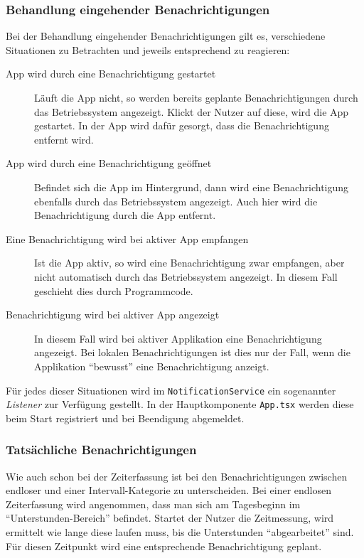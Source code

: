 \subsubsection{Behandlung eingehender Benachrichtigungen}
Bei der Behandlung eingehender Benachrichtigungen gilt es,
verschiedene Situationen zu Betrachten und jeweils entsprechend zu reagieren: \cite{Introduc87:online}
\begin{description}
    \item[App wird durch eine Benachrichtigung gestartet]
    Läuft die App nicht, so werden bereits geplante Benachrichtigungen durch das Betriebssystem angezeigt.
    Klickt der Nutzer auf diese, wird die App gestartet.
    In der App wird dafür gesorgt, dass die Benachrichtigung entfernt wird.

    \item[App wird durch eine Benachrichtigung geöffnet]
    Befindet sich die App im Hintergrund,
    dann wird eine Benachrichtigung ebenfalls durch das Betriebssystem angezeigt.
    Auch hier wird die Benachrichtigung durch die App entfernt.

    \item[Eine Benachrichtigung wird bei aktiver App empfangen]
    Ist die App aktiv, so wird eine Benachrichtigung zwar empfangen,
    aber nicht automatisch durch das Betriebssystem angezeigt.
    In diesem Fall geschieht dies durch Programmcode.

    \item[Benachrichtigung wird bei aktiver App angezeigt]
    In diesem Fall wird bei aktiver Applikation eine Benachrichtigung angezeigt.
    Bei lokalen Benachrichtigungen ist dies nur der Fall,
    wenn die Applikation \enquote{bewusst} eine Benachrichtigung anzeigt.
\end{description}

\noindent
Für jedes dieser Situationen wird im \texttt{NotificationService} ein sogenannter \emph{Listener} zur Verfügung gestellt.
In der Hauptkomponente \texttt{App.tsx} werden diese beim Start registriert und bei Beendigung abgemeldet.

\subsubsection{Tatsächliche Benachrichtigungen}
Wie auch schon bei der Zeiterfassung ist bei den Benachrichtigungen zwischen endloser und einer Intervall-Kategorie zu unterscheiden.
Bei einer endlosen Zeiterfassung wird angenommen,
dass man sich am Tagesbeginn im \enquote{Unterstunden-Bereich} befindet.
Startet der Nutzer die Zeitmessung, wird ermittelt wie lange diese laufen muss,
bis die Unterstunden \enquote{abgearbeitet} sind.
Für diesen Zeitpunkt wird eine entsprechende Benachrichtigung geplant.

